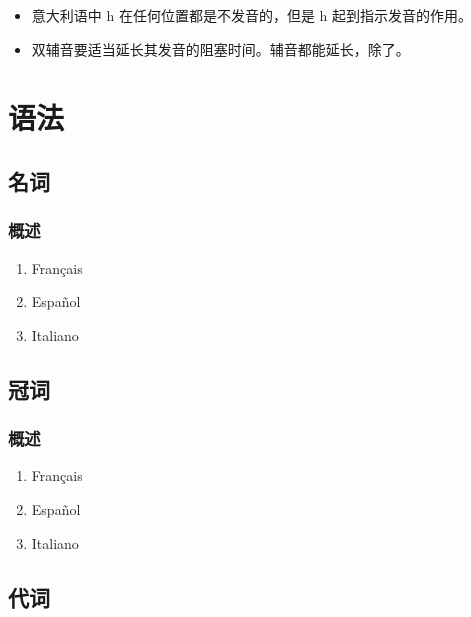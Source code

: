 \documentclass[UTF8,a4paper,titlepage,10pt]{report}
\begin{document}
\begin{enumerate}
\begin{itemize}
\item 意大利语中 h 在任何位置都是不发音的，但是 h 起到指示发音的作用。
\item 双辅音要适当延长其发音的阻塞时间。辅音都能延长，除了\textipa{[z]}。
\end{itemize}
\end{enumerate}

\part{语法}
\label{sec:org04e07a8}

\chapter{名词}
\label{sec:org055dd2b}

\section{概述}
\label{sec:orgf552f88}

\begin{enumerate}
\item Français
\label{sec:org6ab3644}

\item Español
\label{sec:orgefc7e11}

\item Italiano
\label{sec:orge4a5df7}
\end{enumerate}

\chapter{冠词}
\label{sec:orge85c577}

\section{概述}
\label{sec:org4ccd5bc}

\begin{enumerate}
\item Français
\label{sec:org82e055c}

\item Español
\label{sec:orgf029ad9}

\item Italiano
\label{sec:orgca40ed6}
\end{enumerate}

\chapter{代词}
\label{sec:orgded89ba}
\end{document}
